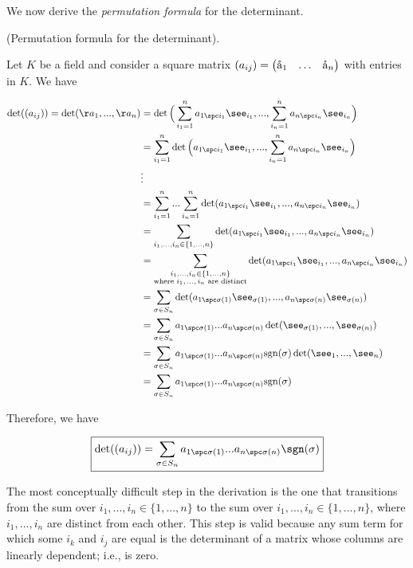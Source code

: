 We now derive the \textit{permutation formula} for the determinant.

\begin{deriv}
\label{ch::lin_alg::deriv::permutation_formula_for_determinant}
    (Permutation formula for the determinant).
        
    Let $K$ be a field and consider a square matrix $(a_{ij}) = \begin{pmatrix} \aa_1 & \hdots & \aa_n \end{pmatrix}$ with entries in $K$. We have
    
    \begin{align*}
        \det((a_{ij})) = \det(\aa_1, ..., \aa_n) &= \det \Big(\sum_{i_1 = 1}^n a_{1 \spc i_1} \see_{i_1}, ..., \sum_{i_n = 1}^n a_{n \spc i_n} \see_{i_n} \Big) \\
        &= \sum_{i_1 = 1}^n \det \Big( a_{1 \spc i_1} \see_{i_1}, ..., \sum_{i_n = 1}^n a_{n \spc i_n} \see_{i_n} \Big) \\
        &\vdots \\
        &= \sum_{i_1 = 1}^n ... \sum_{i_n = 1}^n \det(a_{1 \spc i_1} \see_{i_1}, ..., a_{n \spc i_n} \see_{i_n}) \\
        &= \sum_{i_1, ..., i_n \in \{1, ..., n\}} \det(a_{1 \spc i_1} \see_{i_1}, ..., a_{n \spc i_n} \see_{i_n}) \\
        &= \sum_{\substack{i_1, ..., i_n \in \{1, ..., n\} \\ \text{where $i_1, ..., i_n$ are distinct}}} \det(a_{1 \spc i_1} \see_{i_1}, ..., a_{n \spc i_n} \see_{i_n}) \\
        &= \sum_{\sigma \in S_n}
        \det(a_{1 \spc \sigma(1)} \see_{\sigma(1)}, ..., a_{n \spc \sigma(n)} \see_{\sigma(n)}) \\
        &= \sum_{\sigma \in S_n}
        a_{1 \spc \sigma(1)} ... a_{n \spc \sigma(n)} \det(\see_{\sigma(1)}, ..., \see_{\sigma(n)}) \\
        &= \sum_{\sigma \in S_n} a_{1 \spc \sigma(1)} ... a_{n \spc \sigma(n)} \text{sgn}(\sigma)
        \det(\see_1, ..., \see_n) \\
        &= \sum_{\sigma \in S_n} a_{1 \spc \sigma(1)} ... a_{n \spc \sigma(n)} \text{sgn}(\sigma)
    \end{align*}
    
    Therefore, we have
    
    \begin{align*}
        \boxed
        {
            \det((a_{ij})) = \sum_{\sigma \in S_n} a_{1 \spc \sigma(1)} ... a_{n \spc \sigma(n)} \sgn(\sigma)
        }
    \end{align*}
    
    The most conceptually difficult step in the derivation is the one that transitions from the sum over $i_1, ..., i_n \in \{1, ..., n\}$ to the sum over $i_1, ..., i_n \in \{1, ..., n\}$, where $i_1, ..., i_n$ are distinct from each other. This step is valid because any sum term for which some $i_k$ and $i_j$ are equal is the determinant of a matrix whose columns are linearly dependent; i.e., is zero.
\end{deriv}

